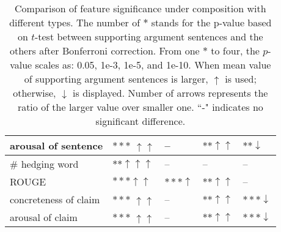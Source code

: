\begin{table}[t]
{\begin{tabular}{|p{1.5cm}|p{1.1cm}|p{1.1cm}|p{1.1cm}|p{1.3cm}|}
    arousal \newline of sentence & $\ast\ast\ast$ $\uparrow\uparrow$ & -- & $\ast\ast\uparrow\uparrow$ & $\ast\ast\downarrow$  \\ \hline
    
    \# hedging \newline word & $\ast\ast\uparrow\uparrow\uparrow$ & -- & -- & --  \\ \hline
    
    ROUGE & $\ast\ast\ast$$\uparrow\uparrow$ & $\ast\ast\ast\uparrow$ & $\ast\ast\uparrow\uparrow$ & --  \\ \hline
    
    
    concreteness \newline of claim&  $\ast\ast\ast$ $\uparrow\uparrow$ & -- & $\ast\ast\uparrow\uparrow$ & $\ast\ast\ast\downarrow$  \\ \hline
    arousal \newline of claim & $\ast\ast\ast$ $\uparrow\uparrow$ & -- & $\ast\ast\uparrow\uparrow$ & $\ast\ast\ast\downarrow$  \\ \hline
    
\end{tabular}
\caption{\fontsize{10}{12}\selectfont Comparison of feature significance under composition with different types. The number of $\ast$ stands for the p-value based on $t$-test between supporting argument sentences and the others after Bonferroni correction. From one $\ast$ to four, the $p$-value scales as: 0.05, 1e-3, 1e-5, and 1e-10. When mean value of supporting argument sentences is larger, $\uparrow$ is used; otherwise, $\downarrow$ is displayed. Number of arrows represents the ratio of the larger value over smaller one. ``-" indicates no significant difference.} 
\label{tab:significance}
\vspace{-.5cm}
}
\end{table}



